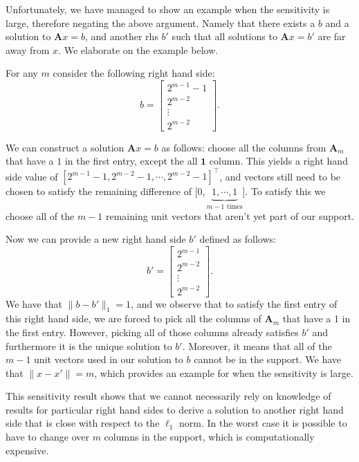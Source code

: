 \documentclass{article}
\newcommand\norm[1]{\lVert#1\rVert}
\begin{document}
Unfortunately, we have managed to show an example when the sensitivity is large, therefore negating the above argument. Namely that there exists a $b$ and a solution to $\mathbf{A}x = b$, and another rhs $b'$ such that all solutions to $\mathbf{A}x = b'$ are far away from $x$. We elaborate on the example below.

For any $m$ consider the following right hand side:
\[
b = \begin{bmatrix}
2^{m-1}-1 \\ 2^{m-2} \\ \vdots \\ 2^{m-2}
\end{bmatrix}.
\]

We can construct a solution $\mathbf{A}x = b$ as follows: choose all the columns from $\mathbf{A}_m$ that have a $1$ in the first entry, except the all $\mathbf{1}$ column. This yields a right hand side value of $[2^{m-1}-1, 2^{m-2} - 1,  \cdots, 2^{m-2} - 1]^\top$, and vectors still need to be chosen to satisfy the remaining difference of $\big[0, \underbrace{1, \cdots, 1}_{m-1 \text{ times}}\big]$. To satisfy this we choose all of the $m-1$ remaining unit vectors that aren't yet part of our support.

Now we can provide a new right hand side $b'$ defined as follows:
\[
b' = \begin{bmatrix}
2^{m-1} \\ 2^{m-2} \\ \vdots \\ 2^{m-2}
\end{bmatrix}.
\]
We have that $\norm{b - b'}_1 = 1$, and we observe that to satisfy the first entry of this right hand side, we are forced to pick all the columns of $\mathbf{A}_m$ that have a 1 in the first entry. However, picking all of those columns already satisfies $b'$ and furthermore it is the unique solution to $b'$. Moreover, it means that all of the $m-1$ unit vectors used in our solution to $b$ cannot be in the support. We have that $\norm{x - x'} = m$, which provides an example for when the sensitivity is large. 

This sensitivity result shows that we cannot necessarily rely on knowledge of results for particular right hand sides to derive a solution to another right hand side that is close with respect to the $\ell_1$ norm. In the worst case it is possible to have to change over $m$ columns in the support, which is computationally expensive. 
\end{document}
